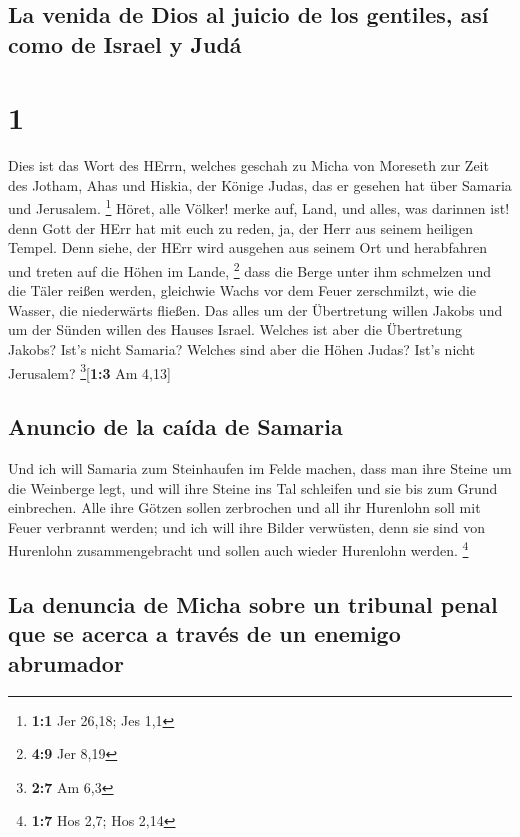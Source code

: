 \hypertarget{la-venida-de-dios-al-juicio-de-los-gentiles-asuxed-como-de-israel-y-juduxe1}{%
\subsection{La venida de Dios al juicio de los gentiles, así como de
Israel y
Judá}\label{la-venida-de-dios-al-juicio-de-los-gentiles-asuxed-como-de-israel-y-juduxe1}}

\hypertarget{section}{%
\section{1}\label{section}}

 Dies ist das Wort des HErrn, welches geschah zu Micha von
Moreseth zur Zeit des Jotham, Ahas und Hiskia, der Könige Judas, das er
gesehen hat über Samaria und Jerusalem. \footnote{\textbf{1:1} Jer
  26,18; Jes 1,1}  Höret, alle Völker! merke auf, Land,
und alles, was darinnen ist! denn Gott der HErr hat mit euch zu reden,
ja, der Herr aus seinem heiligen Tempel.  Denn siehe, der
HErr wird ausgehen aus seinem Ort und herabfahren und treten auf die
Höhen im Lande, \footnote{\textbf{4:9} Jer 8,19}  dass die
Berge unter ihm schmelzen und die Täler reißen werden, gleichwie Wachs
vor dem Feuer zerschmilzt, wie die Wasser, die niederwärts fließen.
 Das alles um der Übertretung willen Jakobs und um der
Sünden willen des Hauses Israel. Welches ist aber die Übertretung
Jakobs? Ist's nicht Samaria? Welches sind aber die Höhen Judas? Ist's
nicht Jerusalem? \footnote{\textbf{2:7} Am 6,3}{[}\textbf{1:3} Am
4,13{]}

\hypertarget{anuncio-de-la-cauxedda-de-samaria}{%
\subsection{Anuncio de la caída de
Samaria}\label{anuncio-de-la-cauxedda-de-samaria}}

 Und ich will Samaria zum Steinhaufen im Felde machen,
dass man ihre Steine um die Weinberge legt, und will ihre Steine ins Tal
schleifen und sie bis zum Grund einbrechen.  Alle ihre
Götzen sollen zerbrochen und all ihr Hurenlohn soll mit Feuer verbrannt
werden; und ich will ihre Bilder verwüsten, denn sie sind von Hurenlohn
zusammengebracht und sollen auch wieder Hurenlohn werden. \footnote{\textbf{1:7}
  Hos 2,7; Hos 2,14}

\hypertarget{la-denuncia-de-micha-sobre-un-tribunal-penal-que-se-acerca-a-travuxe9s-de-un-enemigo-abrumador}{%
\subsection{La denuncia de Micha sobre un tribunal penal que se acerca a
través de un enemigo
abrumador}\label{la-denuncia-de-micha-sobre-un-tribunal-penal-que-se-acerca-a-travuxe9s-de-un-enemigo-abrumador}}

